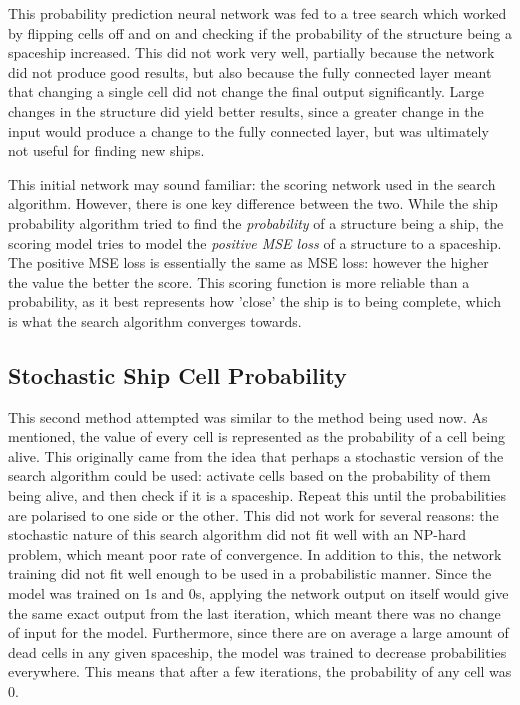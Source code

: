 \documentclass{l4proj}
\begin{document}
This probability prediction neural network was fed to a tree search which worked by flipping cells off and on and checking if the probability of the structure being a spaceship increased. This did not work very well, partially because the network did not produce good results, but also because the fully connected layer meant that changing a single cell did not change the final output significantly. Large changes in the structure did yield better results, since a greater change in the input would produce a change to the fully connected layer, but was ultimately not useful for finding new ships. 

This initial network may sound familiar: the scoring network used in the search algorithm. However, there is one key difference between the two. While the ship probability algorithm tried to find the \emph{probability} of a structure being a ship, the scoring model tries to model the \emph{positive MSE loss} of a structure to a spaceship. The positive MSE loss is essentially the same as MSE loss: however the higher the value the better the score. This scoring function is more reliable than a probability, as it best represents how 'close' the ship is to being complete, which is what the search algorithm converges towards.

\subsection {Stochastic Ship Cell Probability}

This second method attempted was similar to the method being used now. As mentioned, the value of every cell is represented as the probability of a cell being alive. This originally came from the idea that perhaps a stochastic version of the search algorithm could be used: activate cells based on the probability of them being alive, and then check if it is a spaceship. Repeat this until the probabilities are polarised to one side or the other. This did not work for several reasons: the stochastic nature of this search algorithm did not fit well with an NP-hard problem, which meant poor rate of convergence. In addition to this, the network training did not fit well enough to be used in a probabilistic manner. Since the model was trained on 1s and 0s, applying the network output on itself would give the same exact output from the last iteration, which meant there was no change of input for the model. Furthermore, since there are on average a large amount of dead cells in any given spaceship, the model was trained to decrease probabilities everywhere. This means that after a few iterations, the probability of any cell was 0.
\end{document}
